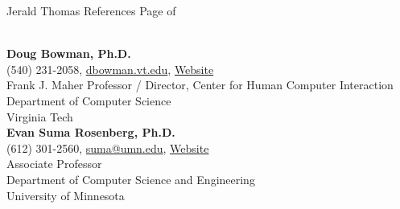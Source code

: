 \newpage

\setcounter{page}{1}
\makecvfooter
  {Jerald Thomas}
  {References}
  {Page \thepage \hspace{1pt} of \pageref{references_last}}


\makecvheader[C]
\singlespacing

\\

\textbf{Doug Bowman, Ph.D.}\\
\hspace*{0.25cm}\faPhone\hspace*{0.1cm}(540) 231-2058,\hspace*{0.2cm} \faEnvelopeO\hspace*{0.1cm}\href{mailto://dbowman@vt.edu}{dbowman.vt.edu}, \faLink\hspace*{0.1cm}\href{https://people.cs.vt.edu/~bowman/}{Website}\\
\hspace*{0.25cm} Frank J. Maher Professor / Director, Center for Human Computer Interaction\\
\hspace*{0.25cm} Department of Computer Science\\
\hspace*{0.25cm} Virginia Tech\\

\textbf{Evan Suma Rosenberg, Ph.D.}\\
\hspace*{0.25cm}\faPhone\hspace*{0.1cm}(612) 301-2560,\hspace*{0.2cm} \faEnvelopeO\hspace*{0.1cm}\href{mailto://suma@umn.edu}{suma@umn.edu}, \faLink\hspace*{0.1cm}\href{https://illusioneering.umn.edu}{Website}\\
\hspace*{0.25cm} Associate Professor\\
\hspace*{0.25cm} Department of Computer Science and Engineering\\
\hspace*{0.25cm} University of Minnesota\\

